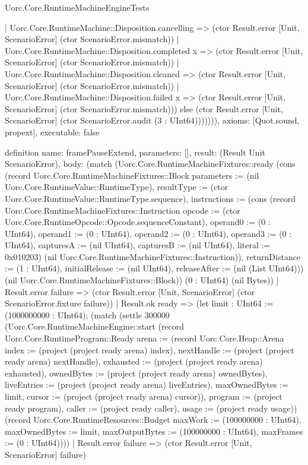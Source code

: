 \begin{lexlean}{Uorc.Core.RuntimeMachineEngineTests}
\begin{semanticmodule}
{        | Uorc.Core.RuntimeMachine::Disposition.cancelling => (ctor Result.error [Unit, ScenarioError] (ctor ScenarioError.mismatch))
        | Uorc.Core.RuntimeMachine::Disposition.completed x => (ctor Result.error [Unit, ScenarioError] (ctor ScenarioError.mismatch))
        | Uorc.Core.RuntimeMachine::Disposition.cleaned => (ctor Result.error [Unit, ScenarioError] (ctor ScenarioError.mismatch))
        | Uorc.Core.RuntimeMachine::Disposition.failed x => (ctor Result.error [Unit, ScenarioError] (ctor ScenarioError.mismatch))) else (ctor Result.error [Unit, ScenarioError] (ctor ScenarioError.audit (3 : UInt64))))))),
  axioms: [Quot.sound, propext],
  executable: false
}

definition{
  name: framePauseExtend,
  parameters: [],
  result: (Result Unit ScenarioError),
  body: (match (Uorc.Core.RuntimeMachineFixtures::ready (cons (record Uorc.Core.RuntimeMachineFixtures::Block {parameters := (nil Uorc.Core.RuntimeValue::RuntimeType), resultType := (ctor Uorc.Core.RuntimeValue::RuntimeType.sequence), instructions := (cons (record Uorc.Core.RuntimeMachineFixtures::Instruction {opcode := (ctor Uorc.Core.RuntimeOpcode::Opcode.sequenceConstant), operand0 := (0 : UInt64), operand1 := (0 : UInt64), operand2 := (0 : UInt64), operand3 := (0 : UInt64), capturesA := (nil UInt64), capturesB := (nil UInt64), literal := 0x010203}) (nil Uorc.Core.RuntimeMachineFixtures::Instruction)), returnDistance := (1 : UInt64), initialRelease := (nil UInt64), releaseAfter := (nil (List UInt64))}) (nil Uorc.Core.RuntimeMachineFixtures::Block)) (0 : UInt64) (nil Bytes))
    | Result.error failure => (ctor Result.error [Unit, ScenarioError] (ctor ScenarioError.fixture failure))
    | Result.ok ready => (let limit : UInt64 := (1000000000 : UInt64); (match (settle 300000 (Uorc.Core.RuntimeMachineEngine::start (record Uorc.Core.RuntimeProgram::Ready {arena := (record Uorc.Core.Heap::Arena {index := (project (project ready arena) index), nextHandle := (project (project ready arena) nextHandle), exhausted := (project (project ready arena) exhausted), ownedBytes := (project (project ready arena) ownedBytes), liveEntries := (project (project ready arena) liveEntries), maxOwnedBytes := limit, cursor := (project (project ready arena) cursor)}), program := (project ready program), caller := (project ready caller), usage := (project ready usage)}) (record Uorc.Core.RuntimeResources::Budget {maxWork := (100000000 : UInt64), maxOwnedBytes := limit, maxOutputBytes := (100000000 : UInt64), maxFrames := (0 : UInt64)})))
      | Result.error failure => (ctor Result.error [Unit, ScenarioError] failure)
}
\end{semanticmodule}
\end{lexlean}
